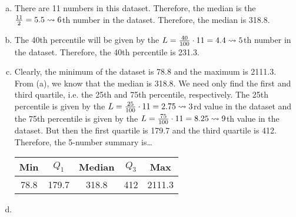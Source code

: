 \documentclass[11pt,letterpaper]{article}
\begin{document}
\begin{enumerate}[(a)]
\item There are 11 numbers in this dataset. Therefore, the median is the $\frac{11}{2}= 5.5 \rightsquigarrow 6$th number in the dataset. Therefore, the median is 318.8. \pspace

\item The 40th percentile will be given by the $L= \frac{40}{100} \cdot 11= 4.4 \rightsquigarrow 5$th number in the dataset. Therefore, the 40th percentile is 231.3. \pspace

\item Clearly, the minimum of the dataset is 78.8 and the maximum is 2111.3. From (a), we know that the median is 318.8. We need only find the first and third quartile, i.e. the 25th and 75th percentile, respectively. The 25th percentile is given by the  $L= \frac{25}{100} \cdot 11= 2.75 \rightsquigarrow 3$rd value in the dataset and the 75th percentile is given by the $L= \frac{75}{100} \cdot 11= 8.25 \rightsquigarrow 9$th value in the dataset. But then the first quartile is 179.7 and the third quartile is 412. Therefore, the 5-number summary is\dots \par
	\begin{table}[h]
	\centering
	\begin{tabular}{ccccc}
	Min & $Q_1$ & Median & $Q_3$ & Max \\ \hline
	78.8 & 179.7 & 318.8 & 412 & 2111.3 
	\end{tabular}
	\end{table}

\item \phantom{.} \par
	\begin{figure}[!ht]
	\centering
	\end{figure}
\end{enumerate}
\end{document}
